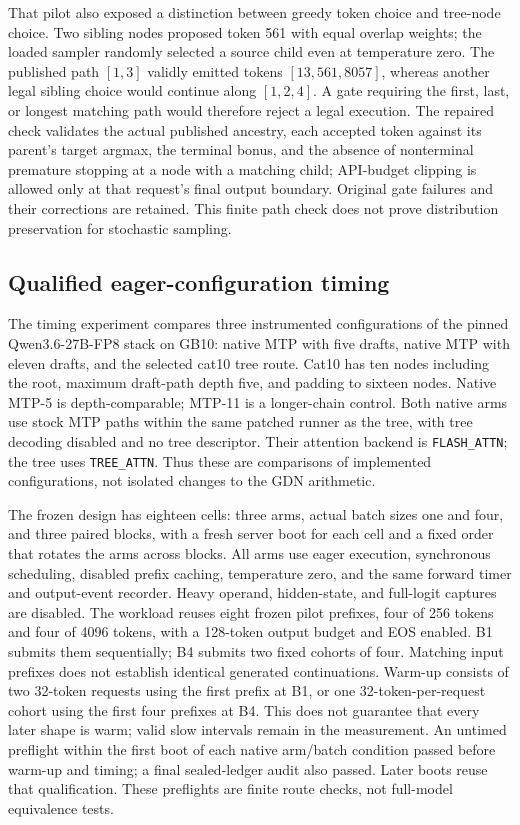 \documentclass[conference]{IEEEtran}
\begin{document}
That pilot also exposed a distinction between greedy token choice and tree-node choice. Two sibling nodes proposed token 561 with equal overlap weights; the loaded sampler randomly selected a source child even at temperature zero. The published path $[1,3]$ validly emitted tokens $[13,561,8057]$, whereas another legal sibling choice would continue along $[1,2,4]$. A gate requiring the first, last, or longest matching path would therefore reject a legal execution. The repaired check validates the actual published ancestry, each accepted token against its parent's target argmax, the terminal bonus, and the absence of nonterminal premature stopping at a node with a matching child; API-budget clipping is allowed only at that request's final output boundary. Original gate failures and their corrections are retained. This finite path check does not prove distribution preservation for stochastic sampling.

\subsection{Qualified eager-configuration timing}
\label{sec:e1-timing}
The timing experiment compares three instrumented configurations of the pinned Qwen3.6-27B-FP8 stack on GB10: native MTP with five drafts, native MTP with eleven drafts, and the selected cat10 tree route. Cat10 has ten nodes including the root, maximum draft-path depth five, and padding to sixteen nodes. Native MTP-5 is depth-comparable; MTP-11 is a longer-chain control. Both native arms use stock MTP paths within the same patched runner as the tree, with tree decoding disabled and no tree descriptor. Their attention backend is \texttt{FLASH\_ATTN}; the tree uses \texttt{TREE\_ATTN}. Thus these are comparisons of implemented configurations, not isolated changes to the GDN arithmetic.

The frozen design has eighteen cells: three arms, actual batch sizes one and four, and three paired blocks, with a fresh server boot for each cell and a fixed order that rotates the arms across blocks. All arms use eager execution, synchronous scheduling, disabled prefix caching, temperature zero, and the same forward timer and output-event recorder. Heavy operand, hidden-state, and full-logit captures are disabled. The workload reuses eight frozen pilot prefixes, four of 256 tokens and four of 4096 tokens, with a 128-token output budget and EOS enabled. B1 submits them sequentially; B4 submits two fixed cohorts of four. Matching input prefixes does not establish identical generated continuations. Warm-up consists of two 32-token requests using the first prefix at B1, or one 32-token-per-request cohort using the first four prefixes at B4. This does not guarantee that every later shape is warm; valid slow intervals remain in the measurement. An untimed preflight within the first boot of each native arm/batch condition passed before warm-up and timing; a final sealed-ledger audit also passed. Later boots reuse that qualification. These preflights are finite route checks, not full-model equivalence tests.
\end{document}
